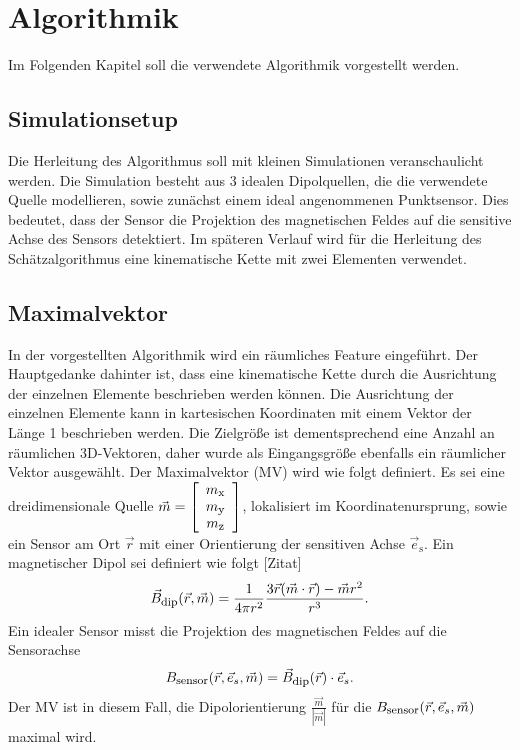 \chapter{Algorithmik}
\label{chap:char_algorithmik}
Im Folgenden Kapitel soll die verwendete Algorithmik vorgestellt werden.     
\section{Simulationsetup}
Die Herleitung des Algorithmus soll mit kleinen Simulationen veranschaulicht werden. Die Simulation besteht aus 3 idealen Dipolquellen, die die verwendete Quelle modellieren, sowie zunächst einem ideal angenommenen Punktsensor. Dies bedeutet, dass der Sensor die Projektion des magnetischen Feldes auf die sensitive Achse des Sensors detektiert. Im späteren Verlauf wird für die Herleitung des Schätzalgorithmus eine kinematische Kette mit zwei Elementen verwendet. 

\section{Maximalvektor}
	In der vorgestellten Algorithmik wird ein räumliches Feature eingeführt. Der Hauptgedanke dahinter ist, dass eine kinematische Kette durch die Ausrichtung der einzelnen Elemente beschrieben werden können. Die Ausrichtung der einzelnen Elemente kann in kartesischen Koordinaten mit einem Vektor der Länge 1 beschrieben werden. Die Zielgröße ist dementsprechend eine Anzahl an räumlichen 3D-Vektoren, daher wurde als Eingangsgröße ebenfalls ein räumlicher Vektor ausgewählt.
	Der Maximalvektor (MV) wird wie folgt definiert. Es sei eine dreidimensionale Quelle $\vec{m} = \left[\begin{array}{c} m_{\textrm{\footnotesize{x}}}\\ m_{\textrm{\footnotesize{y}}} \\ m_{\textrm{\footnotesize{z}}}\end{array}\right] $, lokalisiert im Koordinatenursprung, sowie ein Sensor am Ort $\vec{r}$ mit einer Orientierung der sensitiven Achse $\vec{e}_\text{s}$. 
	Ein magnetischer Dipol sei definiert wie folgt [Zitat]
	\begin{equation}
		\vec{B}_{\textrm{\footnotesize{dip}}}(\vec{r},\vec{m}) = \frac{1}{4\pi r^2}\frac{3\vec{r}(\vec{m}\cdot\vec{r})-\vec{m}r^2}{r^3}.
		\label{eq:magDipolDef}
	\end{equation}
	Ein idealer Sensor misst die Projektion des magnetischen Feldes auf die Sensorachse
	\begin{equation}
		B_{\textrm{\footnotesize{sensor}}}(\vec{r},\vec{e}_s,\vec{m}) =  \vec{B}_{\textrm{\footnotesize{dip}}}(\vec{r}) \cdot \vec{e}_s.
		\label{eq:magDipSensor}
	 \end{equation}
	Der MV ist in diesem Fall, die Dipolorientierung $\frac{\vec{m}}{|\vec{m}|}$ für die $B_{\textrm{\footnotesize{sensor}}}(\vec{r},\vec{e}_s,\vec{m})$ maximal wird.

